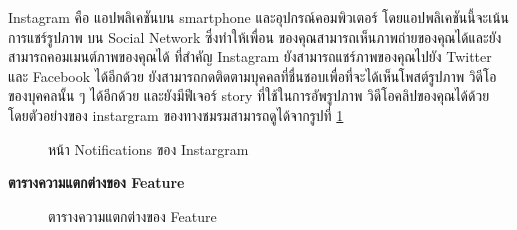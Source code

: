 \documentclass[14pt,oneside,openright,a4paper]{cpe-thai-project}
\begin{document}
\newpage

Instagram คือ แอปพลิเคชันบน smartphone และอุปกรณ์คอมพิวเตอร์ โดยแอปพลิเคชันนี้จะเน้นการแชร์รูปภาพ บน Social Network ซึ่งทำให้เพื่อน ของคุณสามารถเห็นภาพถ่ายของคุณได้และยังสามารถคอมเมนต์ภาพของคุณได้  	   ที่สำคัญ Instagram ยังสามารถแชร์ภาพของคุณไปยัง Twitter และ Facebook ได้อีกด้วย ยังสามารถกดติดตามบุคคลที่ชื่นชอบเพื่อที่จะได้เห็นโพสต์รูปภาพ วิดีโอ ของบุคคลนั้น ๆ ได้อีกด้วย และยังมีฟีเจอร์ story ที่ใช้ในการอัพรูปภาพ วิดีโอคลิปของคุณได้ด้วย โดยตัวอย่างของ instargram ของทางชมรมสามารถดูได้จากรูปที่ \ref{fig:ig}

  \begin{figure}[!h]\centering
    \setlength{\fboxrule}{0.5mm} %
    \setlength{\fboxsep}{0.5cm}
    \caption{หน้า Notifications ของ Instargram}\label{fig:ig}
    \end{figure}

\newpage

\large\textbf{ตารางความแตกต่างของ Feature}

  \begin{figure}[!h]\centering
    \setlength{\fboxrule}{0.5mm} %
    \setlength{\fboxsep}{0.5cm}
    \caption{ตารางความแตกต่างของ Feature}\label{fig:DiffFeat}
    \end{figure}
\end{document}
